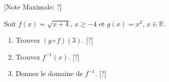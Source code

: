 \begin{question}
  \hspace*{\fill} [Note Maximale: ?]\par
  \medskip
  \noindent Soit $f(x) = \sqrt{x + 4}$, $ x \ge - 4$ et $g(x) = x^2$, $x \in \mathbb{R}$.\par
  \begin{enumerate}[label=(\alph*)]
    \item Trouvez $(g \circ f)(3)$.\hspace*{\fill} [?]
    \item Trouvez $f^{-1}(x)$.\hspace*{\fill} [?]
    \item Donnez le domaine de $f^{-1}$.\hspace*{\fill} [?]
  \end{enumerate}
\end{question}

